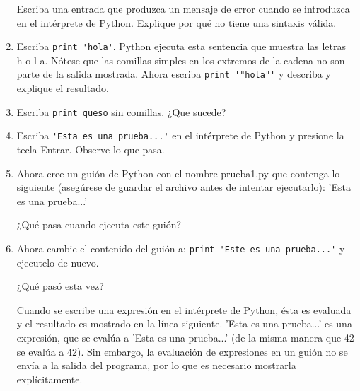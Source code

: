 \begin{enumerate}
Escriba una entrada que produzca un mensaje de error cuando se 
introduzca en el intérprete de Python. Explique por qué no tiene una sintaxis 
válida.


\item Escriba \verb+print 'hola'+. Python ejecuta esta sentencia que muestra las letras h-o-l-a. 
Nótese que las comillas simples en los extremos de la cadena no son parte de la salida mostrada. 
Ahora escriba  \verb+print '"hola"'+ y describa y explique el resultado.

\item Escriba \verb+print queso+ sin comillas. ¿Que sucede?


\item Escriba \verb+'Esta es una prueba...'+ en el intérprete de Python y presione la tecla Entrar. 
Observe lo que pasa. 

\item Ahora cree un guión de Python con el nombre prueba1.py que contenga lo siguiente 
(asegúrese de guardar el archivo antes de intentar ejecutarlo):
'Esta es una prueba...'

¿Qué pasa cuando ejecuta este guión? 

\item Ahora cambie el contenido del guión a: \verb+print 'Este es una prueba...'+ y ejecutelo de nuevo.

¿Qué pasó esta vez?

Cuando se escribe una expresión en el intérprete de Python, ésta es evaluada y el 
resultado es mostrado en la línea siguiente. 'Esta es una prueba...' es una expresión, que se 
evalúa a 'Esta es una prueba...' (de la misma manera que 42 se evalúa a 42). Sin embargo, la 
evaluación de expresiones en un guión no se envía a la salida del programa, por lo que es necesario 
mostrarla explícitamente.
\end{enumerate}

